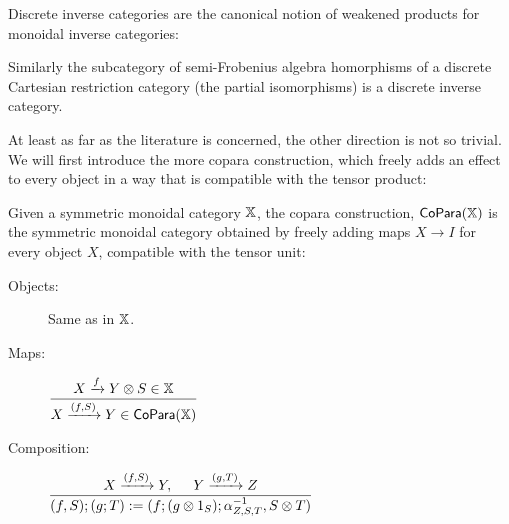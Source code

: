 Discrete inverse categories are the canonical notion of weakened products for monoidal inverse categories:

\begin{lemma}
Similarly the subcategory of  semi-Frobenius algebra homorphisms of a discrete Cartesian restriction category (the partial isomorphisms) is a discrete inverse category.
\end{lemma}



At least as far as the literature is concerned, the other direction is not so trivial.  We will first introduce the more copara construction, which freely adds an effect to every object in a way that is compatible with the tensor product:


\begin{definition}
Given a symmetric monoidal category $\mathbb{X}$, the copara construction, ${\sf CoPara}(\mathbb{X})$ is the symmetric monoidal category obtained by freely adding maps $X\to I$ for every object $X$, compatible with the tensor unit:

\begin{description}
\item[Objects:] Same as in $\mathbb{X}$.

\item[Maps:]  
\hfil $
\dfrac{ X\xrightarrow{f} Y \otimes S \in \mathbb{X}           }
         { X\xrightarrow{(f,S)} Y \in  {\sf CoPara}(\mathbb{X}) }
$

\item[Composition:]
\hfil $
\dfrac{X\xrightarrow{(f,S)} Y , \hspace*{.5cm} Y\xrightarrow{(g,T)} Z }
         {(f,S);(g;T) := (f;(g\otimes 1_S);\alpha^{-1}_{Z,S,T} ,S\otimes T) } 
$


\end{description}
\end{definition}
